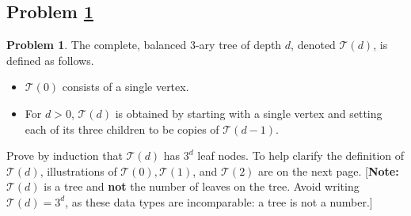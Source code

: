 \documentclass[11pt]{article}
\theoremstyle{definition}
\theoremstyle{definition}
\newtheorem{required}{Problem}
\theoremstyle{definition}
\begin{document}
\newpage
\subsection{Problem \ref{Induction3}}
\begin{required} \label{Induction3}
The complete, balanced 3-ary tree of depth $d$, denoted $\mathcal{T}(d)$, is defined as follows. 
\begin{itemize}
\item $\mathcal{T}(0)$ consists of a single vertex.
\item For $d > 0$, $\mathcal{T}(d)$ is obtained by starting with a single vertex and setting each of its three children to be copies of $\mathcal{T}(d-1)$.
\end{itemize}

\noindent Prove by induction that $\mathcal{T}(d)$ has $3^{d}$ leaf nodes. To help clarify the definition of $\mathcal{T}(d)$, illustrations of $\mathcal{T}(0), \mathcal{T}(1)$, and $\mathcal{T}(2)$ are on the next page. [\textbf{Note:} $\mathcal{T}(d)$ is a tree and \textbf{not} the number of leaves on the tree. Avoid writing $\mathcal{T}(d) = 3^{d}$, as these data types are incomparable: a tree is not a number.]
\end{required}
\end{document}
